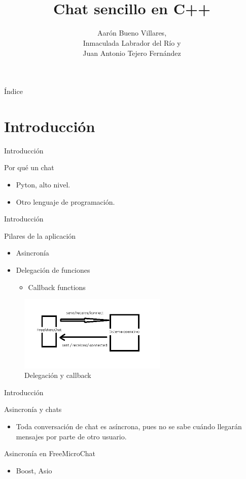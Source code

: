 \documentclass[spanish,xcolor=dvipsnames,svgnames]{beamer}
\title[PECS]%
{\freemc \\ Chat sencillo en  C++}
\author[Bueno,Labrador,Tejero]{Aarón Bueno Villares,\\Inmaculada Labrador del Río  y\\ Juan Antonio Tejero Fernández}
\institute[UCA]{
  \begin{small}Universidad de Cádiz\end{small} \\ \bigskip \bigskip
  \begin{normalsize}Programación en entornos cliente-servidor\end{normalsize} \\ \smallskip
}
\begin{document}
\begin{frame}
  \titlepage
\end{frame}

\begin{frame}{Índice}
  \tableofcontents
\end{frame}

\section{Introducción}

\begin{frame}{Introducción}
  \begin{block}{Por qué un chat}
    \begin{itemize}
        \item Pyton, alto nivel.
        \item Otro lenguaje de programación.
    \end{itemize}
  \end{block}
\end{frame}

\begin{frame}{Introducción}
  \begin{block}{Pilares de la aplicación}
    \begin{itemize}
    \item Asincronía
    \item Delegación de funciones
      \begin{itemize}
      \item Callback functions
      \end{itemize}
    \end{itemize}
  \end{block}
  \begin{figure}[h]
    \centering
    \includegraphics[width=200pt]{img/Callbacks-funct.png}
    \caption{Delegación y callback}
  \end{figure}
\end{frame}

\begin{frame}{Introducción}
  \begin{block}{Asincronía y chats}
    \begin{itemize}
    \item Toda conversación de chat es asíncrona, pues no se sabe cuándo llegarán mensajes por parte de otro usuario.
    \end{itemize}
  \end{block}
  \begin{block}{Asincronía en FreeMicroChat}
    \begin{itemize}
    \item Boost, Asio
    \end{itemize}
  \end{block}
\end{frame}
\end{document}
